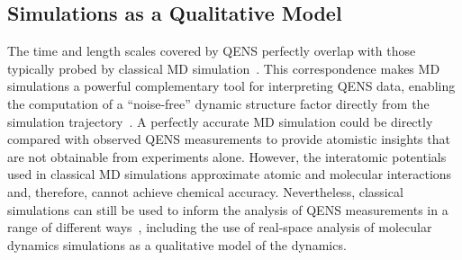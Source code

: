 \documentclass[reprint,
               superscriptaddress,
               nobibnotes,
               amsmath,
               amssymb,
               aps,
               hidelinks, 
               pre]{revtex4-2}
\begin{document}

\subsection*{Simulations as a Qualitative Model}
\label{sec:sims}

The time and length scales covered by QENS perfectly overlap with those typically probed by classical MD simulation~\cite{Armstrong2022}. 
This correspondence makes MD simulations a powerful complementary tool for interpreting QENS data, enabling the computation of a ``noise-free'' dynamic structure factor directly from the simulation trajectory~\cite{Kneller1995, Rog2003, Hinsen2012, Goret2017}. 
A perfectly accurate MD simulation could be directly compared with observed QENS measurements to provide atomistic insights that are not obtainable from experiments alone. 
However, the interatomic potentials used in classical MD simulations approximate atomic and molecular interactions and, therefore, cannot achieve chemical accuracy. 
Nevertheless, classical simulations can still be used to inform the analysis of QENS measurements in a range of different ways~\cite{Morton2025, Petersen2022}, including the use of real-space analysis of molecular dynamics simulations as a qualitative model of the dynamics.
\end{document}
